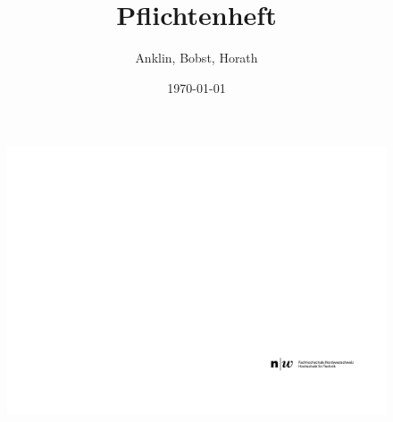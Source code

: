 \documentclass[final]{fhnwreport}       %
\title{Pflichtenheft}  		        %
\author{Anklin, Bobst, Horath}      				    %
\date{\today}          				   %
\begin{document}
\thispagestyle{empty}
	\begin{figure}
		 \vspace*{-\topskip}\vspace*{-\headsep}
		\includegraphics[scale=1]{graphics/fhnw_ht_logo_de.pdf}
	\end{figure}
\end{document}
